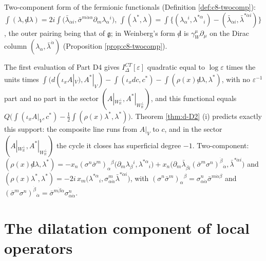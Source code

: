 \begin{example}
Two-component form of the fermionic functionals (Definition \ref{def:c8-twocomp}): $\int(\lambda,{\not d}\lambda)=2i\int\big(\bar\lambda_{\dot\alpha i},\bar\sigma^{m\dot\alpha\alpha}\partial_m\lambda_\alpha{}^i\big)$, $\int(\lambda^*,\lambda)=\int\big\{(\lambda_\alpha{}^i,\lambda^{*\alpha}{}_i)-(\bar\lambda_{\dot\alpha i},\bar\lambda^{*\dot\alpha i})\big\}$, the outer pairing being that of $\mathfrak g$; in Weinberg's form ${\not d}$ is $\gamma_W^\mu\partial_\mu$ on the Dirac column $(\lambda_\alpha,\bar\lambda^{\dot\alpha})$ (Proposition \ref{prop:c8-twocomp}).
\end{example}

\begin{remark}
The first evaluation of Part D4 gives $I^{CT}_\Delta[\varepsilon]$ quadratic equal to $\log\varepsilon$ times the units times $\int(d(\iota_xA|_V),A^*|_V)-\int(\iota_xdc,c^*)-\int(\rho(x){\not d}\lambda,\lambda^*)$, with no $\varepsilon^{-1}$ part and no part in the sector $(A|_{W_{\mathbb R}^\perp},A^*|_{W_{\mathbb R}^\perp})$, and this functional equals $Q\big(\int(\iota_xA|_V,c^*)-\tfrac12\int(\rho(x)\lambda^*,\lambda^*)\big)$. Theorem \ref{thm:d-D2} (i) predicts exactly this support: the composite line runs from $A|_V$ to $c$, and in the sector $(A|_{W_{\mathbb R}^\perp},A^*|_{W_{\mathbb R}^\perp})$ the cycle it closes has superficial degree $-1$. Two-component: $(\rho(x){\not d}\lambda,\lambda^*)=-x_n(\sigma^n\bar\sigma^m)_\alpha{}^\beta\big(\partial_m\lambda_\beta{}^i,\lambda^{*\alpha}{}_i\big)+x_n\big(\partial_m\bar\lambda_{\dot\beta i}(\bar\sigma^m\sigma^n)^{\dot\beta}{}_{\dot\alpha},\bar\lambda^{*\dot\alpha i}\big)$ and $(\rho(x)\lambda^*,\lambda^*)=-2i\,x_m\big(\lambda^{*\alpha}{}_i,\sigma^m_{\alpha\dot\alpha}\bar\lambda^{*\dot\alpha i}\big)$, with $(\sigma^n\bar\sigma^m)_\alpha{}^\beta=\sigma^n_{\alpha\dot\alpha}\bar\sigma^{m\dot\alpha\beta}$ and $(\bar\sigma^m\sigma^n)^{\dot\beta}{}_{\dot\alpha}=\bar\sigma^{m\dot\beta\alpha}\sigma^n_{\alpha\dot\alpha}$.
\end{remark}

\section{The dilatation component of local operators}

